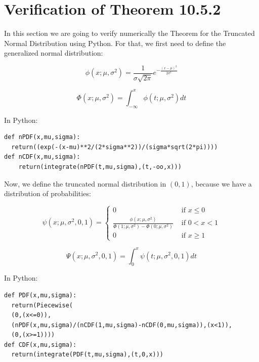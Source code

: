 \chapter{Verification of Theorem 10.5.2}
\label{AppendixA}

In this section we are going to verify numerically the Theorem for the Truncated Normal Distribution using Python. For that, we first need to define the generalized normal distribution:

\begin{equation} \label{eq:Normal_PDF}
\phi (x; \mu, \sigma^2) = \frac{1}{\sigma \sqrt{2 \pi}} e^{-\frac{\left( x - \mu \right)^2}{2\sigma^2}}
\end{equation}

\begin{equation} \label{eq:Normal_CDF}
\Phi (x; \mu, \sigma^2) = \int_{-\infty} ^x \phi (t;\mu,\sigma^2) dt
\end{equation}

In Python:

\begin{verbatim}
def nPDF(x,mu,sigma):
  return((exp(-(x-mu)**2/(2*sigma**2))/(sigma*sqrt(2*pi))))
def nCDF(x,mu,sigma):
    return(integrate(nPDF(t,mu,sigma),(t,-oo,x)))
\end{verbatim}

Now, we define the truncated normal distribution in $(0,1)$, because we have a distribution of probabilities:

\begin{equation} \label{eq:TNormal_PDF}
\psi (x; \mu, \sigma^2,0,1) = 
\begin{cases}
0 & \text{ if } x \leq 0 \\
\frac{\phi(x;\mu, \sigma^2)}{\Phi (1; \mu, \sigma^2)-\Phi (0; \mu, \sigma^2)} & \text{ if } 0 < x < 1 \\
0 & \text{ if } x \geq 1
\end{cases}
\end{equation}

\begin{equation} \label{eq:TNormal_CDF}
\Psi (x; \mu, \sigma^2,0,1) = \int_{0} ^x \psi (t;\mu,\sigma^2,0,1) dt
\end{equation}

In Python:

\begin{verbatim}
def PDF(x,mu,sigma):
  return(Piecewise(
  (0,(x<=0)),
  (nPDF(x,mu,sigma)/(nCDF(1,mu,sigma)-nCDF(0,mu,sigma)),(x<1)),
  (0,(x>=1))))
def CDF(x,mu,sigma):
  return(integrate(PDF(t,mu,sigma),(t,0,x)))
\end{verbatim}

